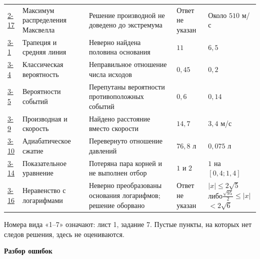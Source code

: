 \documentclass[11pt,a4paper]{article}
\begin{document}
\begin{longtable}{@{}p{1.55cm}p{2.55cm}p{4.15cm}p{2.6cm}p{4.2cm}@{}}
\hyperref[task:2_17]{2-17} & Максимум распределения Максвелла & Решение производной не доведено до экстремума & Ответ не указан & Около $510$ м/с \\
\hyperref[task:3_1]{3-1} & Трапеция и средняя линия & Неверно найдена половина основания & $11$ & $6{,}5$ \\
\hyperref[task:3_4]{3-4} & Классическая вероятность & Неправильное отношение числа исходов & $0{,}45$ & $0{,}2$ \\
\hyperref[task:3_5]{3-5} & Вероятности событий & Перепутаны вероятности противоположных событий & $0{,}6$ & $0{,}14$ \\
\hyperref[task:3_9]{3-9} & Производная и скорость & Найдено расстояние вместо скорости & $14{,}7$ & $3{,}4$ м/с \\
\hyperref[task:3_10]{3-10} & Адиабатическое сжатие & Перевернуто отношение давлений & $76{,}8$ л & $0{,}075$ л \\
\hyperref[task:3_14]{3-14} & Показательное уравнение & Потеряна пара корней и не выполнен отбор & $1$ и $2$ & $1$ на $[0{,}4;1{,}4]$ \\
\hyperref[task:3_16]{3-16} & Неравенство с логарифмами & Неверно преобразованы основания логарифмов; решение оборвано & Ответ не указан & $|x|\le 2\sqrt5$ либо\newline $\frac{\sqrt{95}}2\le|x|$\newline $<2\sqrt6$ \\
\bottomrule
\end{longtable}
\normalsize
Номера вида «1--7» означают: лист 1, задание 7. Пустые пункты, на которых нет следов решения, здесь не оцениваются.
\newpage
\thispagestyle{empty}
\vspace*{\fill}\begin{center}{\LARGE\bfseries Разбор ошибок}\end{center}\vspace*{\fill}
\newpage
{}\label{task:1_7}
\end{document}
